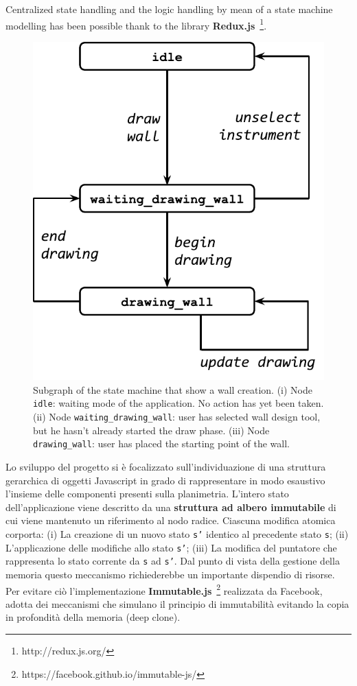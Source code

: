 Centralized state handling and the logic handling by mean of a state machine modelling has been possible thank to the library \textbf{Redux.js}~\footnote{http://redux.js.org/}.


\begin{figure}[!t]
\centering
\includegraphics[width=0.6\linewidth]{contents/images/uc_draw_wall}

\caption{Subgraph of the state machine that show a wall creation. (i) Node \texttt{idle}: waiting mode of the application. No action has yet been taken. (ii) Node \texttt{waiting\_drawing\_wall}: user has selected wall design tool, but he hasn't already started the draw phase. (iii) Node \texttt{drawing\_wall}: user has placed the starting point of the wall.}
\label{fig_uc_draw_wall}
\end{figure}


Lo sviluppo del progetto si \`e focalizzato sull'individuazione di una struttura gerarchica di oggetti Javascript in grado di rappresentare in modo esaustivo l'insieme delle componenti presenti sulla planimetria. L'intero stato dell'applicazione viene descritto da una \textbf{struttura ad albero immutabile} di cui viene mantenuto un riferimento al nodo radice. Ciascuna modifica atomica corporta: (i) La creazione di un nuovo stato \texttt{s'} identico al precedente stato \texttt{s}; (ii) L'applicazione delle modifiche allo stato \texttt{s'}; (iii) La modifica del puntatore che rappresenta lo stato corrente da \texttt{s} ad \texttt{s'}. Dal punto di vista della gestione della memoria questo meccanismo richiederebbe un importante dispendio di risorse. Per evitare ci\`o l'implementazione \textbf{Immutable.js}~\footnote{https://facebook.github.io/immutable-js/} realizzata da Facebook, adotta dei meccanismi che simulano il principio di immutabilit\`a evitando la copia in profondit\`a della memoria  (deep clone).

